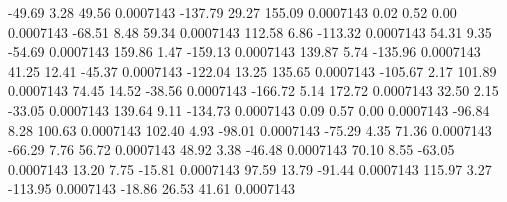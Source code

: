       -49.69        3.28       49.56     0.0007143
     -137.79       29.27      155.09     0.0007143
        0.02        0.52        0.00     0.0007143
      -68.51        8.48       59.34     0.0007143
      112.58        6.86     -113.32     0.0007143
       54.31        9.35      -54.69     0.0007143
      159.86        1.47     -159.13     0.0007143
      139.87        5.74     -135.96     0.0007143
       41.25       12.41      -45.37     0.0007143
     -122.04       13.25      135.65     0.0007143
     -105.67        2.17      101.89     0.0007143
       74.45       14.52      -38.56     0.0007143
     -166.72        5.14      172.72     0.0007143
       32.50        2.15      -33.05     0.0007143
      139.64        9.11     -134.73     0.0007143
        0.09        0.57        0.00     0.0007143
      -96.84        8.28      100.63     0.0007143
      102.40        4.93      -98.01     0.0007143
      -75.29        4.35       71.36     0.0007143
      -66.29        7.76       56.72     0.0007143
       48.92        3.38      -46.48     0.0007143
       70.10        8.55      -63.05     0.0007143
       13.20        7.75      -15.81     0.0007143
       97.59       13.79      -91.44     0.0007143
      115.97        3.27     -113.95     0.0007143
      -18.86       26.53       41.61     0.0007143
